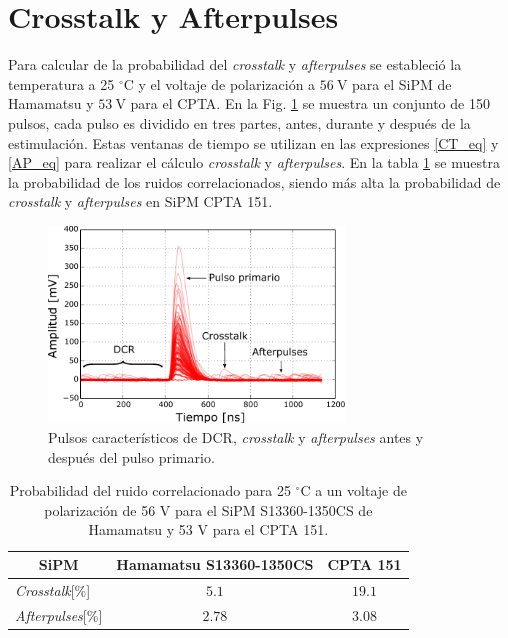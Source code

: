 \section{Crosstalk y Afterpulses}
Para calcular de la probabilidad del \textit{crosstalk} y  \textit{afterpulses} se estableció la temperatura a 25 $^\circ$C y el voltaje de polarización a  $56~\mbox{V}$ para el SiPM de Hamamatsu y $53~\mbox{V}$ para el CPTA. En la Fig. \ref{fig:NoiseP} se muestra un conjunto de 150 pulsos, cada pulso es dividido en tres partes, antes, durante y después de la estimulación. Estas ventanas de tiempo se utilizan en las expresiones \ref{CT_eq} y \ref{AP_eq} para realizar el cálculo \textit{crosstalk} y  \textit{afterpulses}. En la tabla \ref{AP_CT} se muestra la probabilidad de los ruidos correlacionados, siendo más alta la probabilidad de  \textit{crosstalk} y  \textit{afterpulses} en SiPM CPTA 151.   
\begin{figure}[h!]
\begin{centering}
  \includegraphics[width=0.7\textwidth]{Images/100P_1350CS.pdf}
  \caption{Pulsos característicos de DCR, \textit{crosstalk} y \textit{afterpulses} antes y después del pulso primario.}
  \label{fig:NoiseP}
  \par\end{centering}
\end{figure}
\begin{table}[h!]
\caption{Probabilidad del ruido correlacionado para 25 $^\circ$C a un voltaje de polarización de 56 V para el SiPM S13360-1350CS de Hamamatsu y 53 V para el CPTA 151.}
    \label{AP_CT}
	\centering
	\begin{tabular}{ c  c  c}
    \hline
    SiPM       & Hamamatsu S13360-1350CS  & CPTA 151      \\ \hline
    \multicolumn{1}{l}{\textit{Crosstalk}[\%] }     &   $5.1$      & $ 19.1$ \\
    \multicolumn{1}{l}{\textit{Afterpulses}[\%]}      & $2.78$         & $3.08$ \\
	\end{tabular}	
\end{table}
